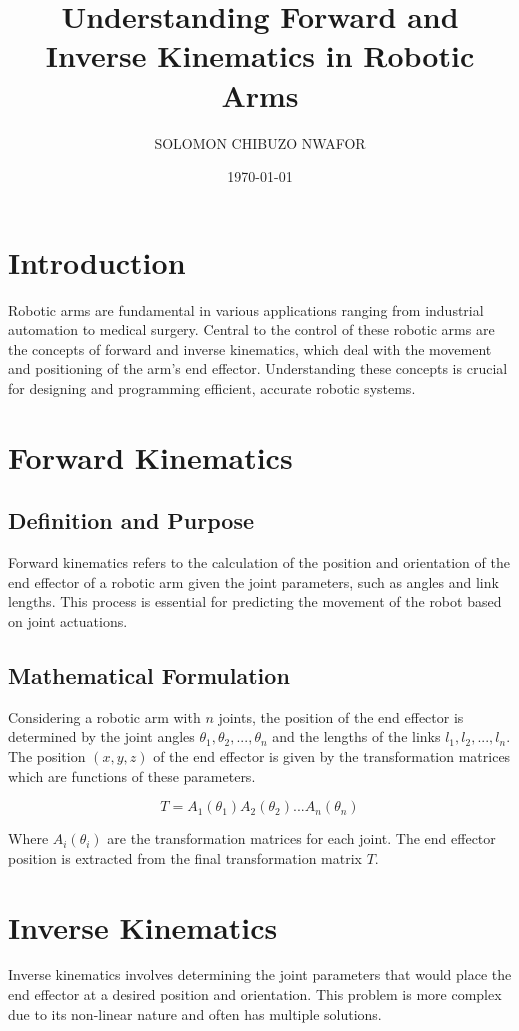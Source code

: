 \documentclass{article}
\title{Understanding Forward and Inverse Kinematics in Robotic Arms}
\author{SOLOMON CHIBUZO NWAFOR}
\date{\today}
\begin{document}
\maketitle

\section{Introduction}
Robotic arms are fundamental in various applications ranging from industrial automation to medical surgery. Central to the control of these robotic arms are the concepts of forward and inverse kinematics, which deal with the movement and positioning of the arm's end effector. Understanding these concepts is crucial for designing and programming efficient, accurate robotic systems.

\section{Forward Kinematics}
\subsection{Definition and Purpose}
Forward kinematics refers to the calculation of the position and orientation of the end effector of a robotic arm given the joint parameters, such as angles and link lengths. This process is essential for predicting the movement of the robot based on joint actuations.

\subsection{Mathematical Formulation}
Considering a robotic arm with \( n \) joints, the position of the end effector is determined by the joint angles \( \theta_1, \theta_2, ..., \theta_n \) and the lengths of the links \( l_1, l_2, ..., l_n \). The position \( (x, y, z) \) of the end effector is given by the transformation matrices which are functions of these parameters.

\[
T = A_1(\theta_1) A_2(\theta_2) ... A_n(\theta_n)
\]

Where \( A_i(\theta_i) \) are the transformation matrices for each joint. The end effector position is extracted from the final transformation matrix \( T \).

\section{Inverse Kinematics}
Inverse kinematics involves determining the joint parameters that would place the end effector at a desired position and orientation. This problem is more complex due to its non-linear nature and often has multiple solutions.
\end{document}
